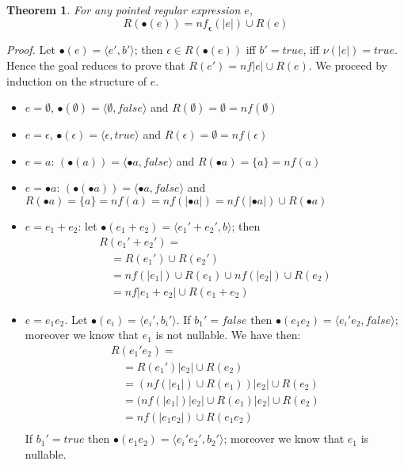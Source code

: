 \documentclass[preprint]{sigplanconf}
\newcommand{\true}{\mathit{true}}
\newcommand{\false}{\mathit{false}}
\newcommand{\nul}[1]{\ensuremath{\nu(#1)}}
\newcommand{\dnf}{\mathit{nf}}
\newcommand{\nf}{\mathit{nf}_{\!\mathbf{\epsilon}}}
\newcounter{item}
\newtheorem{theorem}[item]{Theorem}
\newenvironment{proof}{\begin{trivlist}\item[]{\em Proof.}}{\end{trivlist}}
\begin{document}
\begin{theorem}
For any pointed regular expression $e$,
\[R(\bullet(e)) = \nf(|e|) \cup R(e) \]
\end{theorem}
\begin{proof}
Let $\bullet(e) = \langle e',b' \rangle$; then $\epsilon \in R(\bullet(e))$
iff $b'=true$, iff $\nul{|e|} = \true$. Hence the goal reduces to prove
that $R(e') = \dnf{|e|} \cup R(e)$. 
We proceed by induction on the structure of $e$. 
\begin{itemize}
\item $e = \emptyset$, $\bullet(\emptyset) = \langle \emptyset, \false \rangle$
and 
$R(\emptyset) = \emptyset = \dnf(\emptyset)$
\item $e = \epsilon$, $\bullet(\epsilon) = \langle \epsilon, \true \rangle$
and $R(\epsilon) = \emptyset = \dnf(\epsilon)$
\item $e = a$: $(\bullet(a))= \langle \bullet a, \false \rangle$ and
$R(\bullet a) = \{a\} = \dnf(a)$
\item $e = \bullet a$: $(\bullet(\bullet a))= \langle \bullet a, \false \rangle$ and
$R(\bullet a) = \{a\} = \dnf(a) = \dnf(|\bullet a|) = \dnf(|\bullet a|) \cup R(\bullet a)$
\item $e = e_1+e_2$: let $\bullet(e_1+e_2) = \langle e_1'+e_2',b\rangle$;
then
\[
\begin{array}{l}
R(e_1'+e_2') = \\
\quad = R(e_1')\cup R(e_2') \\
\quad = \dnf(|e_1|) \cup R(e_1) \cup \dnf(|e_2|) \cup R(e_2)\\
\quad = \dnf{|e_1+e_2|} \cup R(e_1+e_2)
\end{array}
\] 
\item $e = e_1e_2$.
Let $\bullet(e_i) = \langle e_i',b_i' \rangle$. If $b_1' = \false$ then
$\bullet(e_1e_2) = \langle e_i'e_2,\false \rangle$; moreover we
know that $e_1$ is not nullable. We have then:
\[
\begin{array}{l}
R(e_1'e_2) = \\
\quad= R(e_1')|e_2| \cup R(e_2) \\
\quad= (\dnf(|e_1|) \cup R(e_1))|e_2| \cup R(e_2)\\
\quad= (\dnf(|e_1|)|e_2| \cup R(e_1)|e_2| \cup R(e_2)\\
\quad=  \dnf(|e_1e_2|) \cup R(e_1e_2)\\
\end{array}
\] 
If $b_1' = \true$ then
$\bullet(e_1e_2) = \langle e_i'e_2',b_2' \rangle$; moreover we
know that $e_1$ is nullable.

\end{itemize}
\end{proof}
\end{document}
